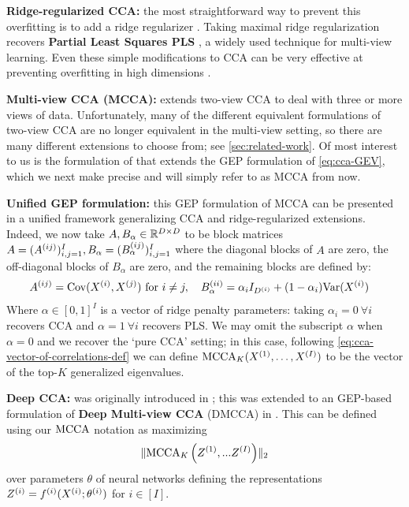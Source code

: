 \textbf{Ridge-regularized CCA:} the most straightforward way to prevent this overfitting is to add a ridge regularizer \citep{vinod1976canonical}.
Taking maximal ridge regularization recovers \textbf{Partial Least Squares PLS} \citep{mihalik_canonical_2022}, a widely used technique for multi-view learning.
Even these simple modifications to CCA can be very effective at preventing overfitting in high dimensions \citep{mihalik_canonical_2022}.

\textbf{Multi-view CCA (MCCA):} extends two-view CCA to deal with three or more views of data. Unfortunately, many of the different equivalent formulations of two-view CCA are no longer equivalent in the multi-view setting, so there are many different extensions to choose from; see \cref{sec:related-work}. Of most interest to us is the formulation of \cite{nielsen2002multiset, wong2021deep} that extends the GEP formulation of \cref{eq:cca-GEV}, which we next make precise and will simply refer to as MCCA from now.

\textbf{Unified GEP formulation:}
this GEP formulation of MCCA can be presented in a unified framework generalizing CCA and ridge-regularized extensions. Indeed, we now take $A,B_\alpha \in \mathbb{R}^{D \times D}$ to be block matrices $A = (A^{(ij)})_{i,j=1}^I, B_\alpha = (B_\alpha^{(ij)})_{i,j=1}^I$ where the diagonal blocks of $A$ are zero, the off-diagonal blocks of $B_\alpha$ are zero, and the remaining blocks are defined by:
\begin{align}\label{eq:gep-most-general-formulation}%
    A^{(ij)} &= \Cov(X\sps{i}, X\sps{j}) \text{ for } i \neq j, \quad %
    B_\alpha^{(ii)} = \alpha_i I_{D\sps{i}} + (1-\alpha_i) \Var(X\sps{i})  %
\end{align}
Where $\alpha \in [0,1]^I$ is a vector of ridge penalty parameters: taking $\alpha_i = 0 \: \forall i$ recovers CCA and $\alpha = 1 \: \forall i$ recovers PLS.
We may omit the subscript $\alpha$ when $\alpha=0$ and we recover the `pure CCA' setting; in this case, following \cref{eq:cca-vector-of-correlations-def} we can define $\operatorname{MCCA}_K(X^{(1)},\dots,X^{(I)})$ to be the vector of the top-$K$ generalized eigenvalues.


\textbf{Deep CCA:} was originally introduced in \cite{andrew2013deep}; this was extended to an GEP-based formulation of \textbf{Deep Multi-view CCA} (DMCCA) in \cite{somandepalli2019multimodal}. This can be defined using our $\operatorname{MCCA}$ notation as maximizing
\begin{align}\label{eq:DMCCA-def}
    \lVert\operatorname{MCCA}_K\left(Z^{(1)}, ... Z^{(I)}\right)\rVert_2
\end{align}
over parameters $\theta$ of neural networks defining the representations $Z^{(i)}=f^{(i)}(X^{(i)};\theta^{(i)})$ for $i\in[I]$.


